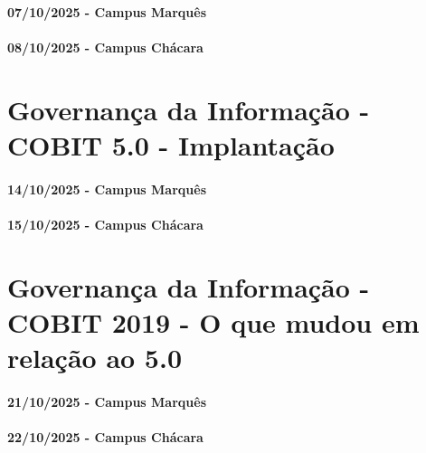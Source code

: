 \documentclass[
]{book}
\begin{document}
\subsubsection*{07/10/2025 - Campus Marquês}\label{campus-marquuxeas-8}

\subsubsection*{08/10/2025 - Campus Chácara}\label{campus-chuxe1cara-8}

\chapter{Governança da Informação - COBIT 5.0 - Implantação}\label{governanuxe7a-da-informauxe7uxe3o---cobit-5.0---implantauxe7uxe3o}

\subsubsection*{14/10/2025 - Campus Marquês}\label{campus-marquuxeas-9}

\subsubsection*{15/10/2025 - Campus Chácara}\label{campus-chuxe1cara-9}

\chapter{Governança da Informação - COBIT 2019 - O que mudou em relação ao 5.0}\label{governanuxe7a-da-informauxe7uxe3o---cobit-2019---o-que-mudou-em-relauxe7uxe3o-ao-5.0}

\subsubsection*{21/10/2025 - Campus Marquês}\label{campus-marquuxeas-10}

\subsubsection*{22/10/2025 - Campus Chácara}\label{campus-chuxe1cara-10}
\end{document}
